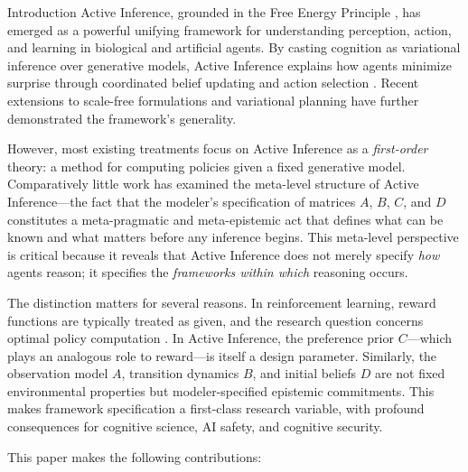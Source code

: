 \documentclass[
  ignorenonframetext,
]{beamer}
\author{\texorpdfstring{}{}}
\date{}
\begin{document}
\begin{frame}{Introduction}
\protect{}\label{sec:introduction}
Active Inference, grounded in the Free Energy Principle
\cite{friston2010free}, has emerged as a powerful unifying framework for
understanding perception, action, and learning in biological and
artificial agents. By casting cognition as variational inference over
generative models, Active Inference explains how agents minimize
surprise through coordinated belief updating and action selection
\cite{friston2015active, parr2022active}. Recent extensions to
scale-free formulations \cite{friston2025scalefree} and variational
planning \cite{champion2025efeplanning} have further demonstrated the
framework's generality.

However, most existing treatments focus on Active Inference as a
\emph{first-order} theory: a method for computing policies given a fixed
generative model. Comparatively little work has examined the meta-level
structure of Active Inference---the fact that the modeler's
specification of matrices \(A\), \(B\), \(C\), and \(D\) constitutes a
meta-pragmatic and meta-epistemic act that defines what can be known and
what matters before any inference begins. This meta-level perspective is
critical because it reveals that Active Inference does not merely
specify \emph{how} agents reason; it specifies the \emph{frameworks
within which} reasoning occurs.

The distinction matters for several reasons. In reinforcement learning,
reward functions are typically treated as given, and the research
question concerns optimal policy computation \cite{sajid2022active}. In
Active Inference, the preference prior \(C\)---which plays an analogous
role to reward---is itself a design parameter. Similarly, the
observation model \(A\), transition dynamics \(B\), and initial beliefs
\(D\) are not fixed environmental properties but modeler-specified
epistemic commitments. This makes framework specification a first-class
research variable, with profound consequences for cognitive science, AI
safety, and cognitive security.

This paper makes the following contributions:


\end{frame}
\end{document}
